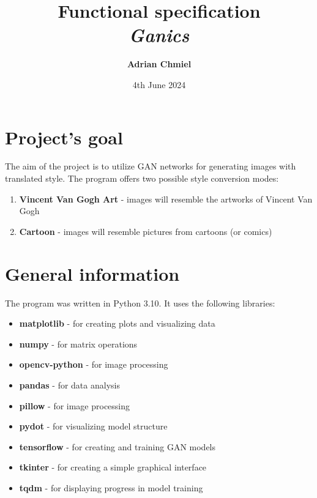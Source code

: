 \documentclass{article}
\begin{document}
\title{\textbf{Functional specification}
\\ \large{\textit{Ganics}}}
\author{\textbf{Adrian Chmiel}}
\date{4th June 2024}
\maketitle

\section{Project's goal}
The aim of the project is to utilize GAN networks for generating images with translated style. The program offers two possible style conversion modes:
\begin{enumerate}[label=\arabic*.]
    \setlength\itemsep{0pt}
    \item \textbf{Vincent Van Gogh Art} - images will resemble the artworks of Vincent Van Gogh
    \item \textbf{Cartoon} - images will resemble pictures from cartoons (or comics)
\end{enumerate}

\section{General information}
The program was written in Python 3.10. It uses the following libraries:
\begin{itemize}
    \setlength\itemsep{0pt}
    \item \textbf{matplotlib} - for creating plots and visualizing data
    \item \textbf{numpy} - for matrix operations
    \item \textbf{opencv-python} - for image processing
    \item \textbf{pandas} - for data analysis
    \item \textbf{pillow} - for image processing
    \item \textbf{pydot} - for visualizing model structure
    \item \textbf{tensorflow} - for creating and training GAN models
    \item \textbf{tkinter} - for creating a simple graphical interface
    \item \textbf{tqdm} - for displaying progress in model training
\end{itemize}
\end{document}
